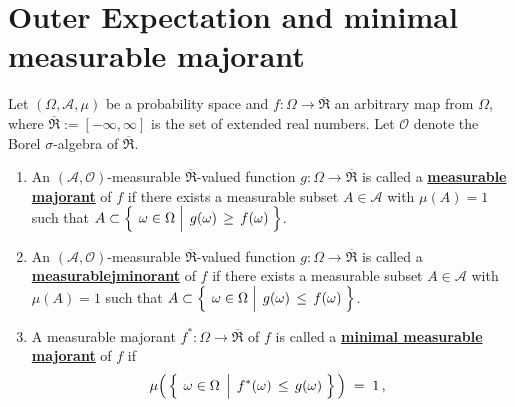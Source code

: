 

\section{Outer Expectation and minimal measurable majorant}
\setcounter{theorem}{0}
\setcounter{equation}{0}


\renewcommand{\theenumi}{\roman{enumi}}
\renewcommand{\labelenumi}{\textnormal{(\theenumi)}$\;\;$}


\begin{definition}
\label{defn:MajorantsOuterExpectation}
\mbox{}\vskip 0.1cm
\noindent
Let $(\Omega,\mathcal{A},\mu)$ be a probability space and
$f : \Omega \longrightarrow \overline{\Re}$
an arbitrary map from $\Omega$, where $\overline{\Re} := [-\infty,\infty]$ is the set of extended real numbers.
Let $\mathcal{O}$ denote the Borel $\sigma$-algebra of $\overline{\Re}$.
\begin{enumerate}
\item
	An $(\mathcal{A},\mathcal{O})$-measurable $\overline{\Re}$-valued function
	$g : \Omega\longrightarrow\overline{\Re}$
	is called a \underline{\textbf{measurable majorant}} of $f$ if there exists a measurable
	subset $A \in \mathcal{A}$ with $\mu(A) = 1$ such that
	$A \subset \left\{\;\left.\omega\overset{{\color{white}.}}{\in}\Omega\;\right\vert\; g(\omega) \,\geq\, f(\omega)\;\right\}$.
\item
	An $(\mathcal{A},\mathcal{O})$-measurable $\overline{\Re}$-valued function
	$g : \Omega\longrightarrow\overline{\Re}$
	is called a \underline{\textbf{measurable{\color{white}j}minorant}} of $f$ if there exists a measurable
	subset $A \in \mathcal{A}$ with $\mu(A) = 1$ such that
	$A \subset \left\{\;\left.\omega\overset{{\color{white}.}}{\in}\Omega\;\right\vert\; g(\omega) \,\leq\, f(\omega)\;\right\}$.
\item
	A measurable majorant $f^{*}:\Omega\longrightarrow\overline{\Re}$ of $f$
	is called a \underline{\textbf{minimal measurable majorant}} of $f$ if
	\begin{equation*}
	\mu\!\left(\,
		\left\{\;\left.\omega\overset{{\color{white}.}}{\in}\Omega\;\,\right\vert\; f^{*}(\omega) \,\leq\, g(\omega)\;\right\}
		\,\right)
	\;=\;1\,,\;\;

\end{equation*}
\end{enumerate}
\end{definition}
